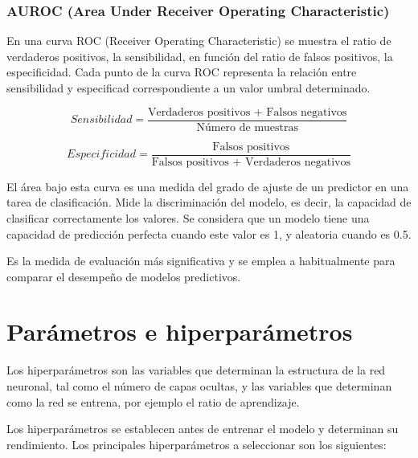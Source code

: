 \documentclass{report}
\begin{document}
\subsubsection{AUROC (Area Under Receiver Operating
Characteristic)}
En una curva ROC (Receiver Operating Characteristic) se muestra el ratio
de verdaderos positivos, la sensibilidad, en función del ratio de falsos
positivos, la especificidad. Cada punto de la curva ROC representa la
relación entre sensibilidad y especificad correspondiente a un valor
umbral determinado.

\[Sensibilidad =  \frac{\textrm{Verdaderos positivos + Falsos negativos}}{\textrm{Número de muestras}}\]

\[Especificidad =  \frac{\textrm{Falsos positivos}}{\textrm{Falsos positivos + Verdaderos negativos}}\]

El área bajo esta curva es una medida del grado de ajuste de un
predictor en una tarea de clasificación. Mide la discriminación del
modelo, es decir, la capacidad de clasificar correctamente los valores.
Se considera que un modelo tiene una capacidad de predicción perfecta
cuando este valor es 1, y aleatoria cuando es 0.5.

Es la medida de evaluación más significativa y se emplea a habitualmente para comparar el desempeño de modelos predictivos. 

\section{Parámetros e hiperparámetros}

Los hiperparámetros son las variables que determinan la estructura de la
red neuronal, tal como el número de capas ocultas, y las variables que
determinan como la red se entrena, por ejemplo el ratio de aprendizaje.

Los hiperparámetros se establecen antes de entrenar el modelo y
determinan su rendimiento. Los principales hiperparámetros a seleccionar
son los siguientes:
\end{document}
